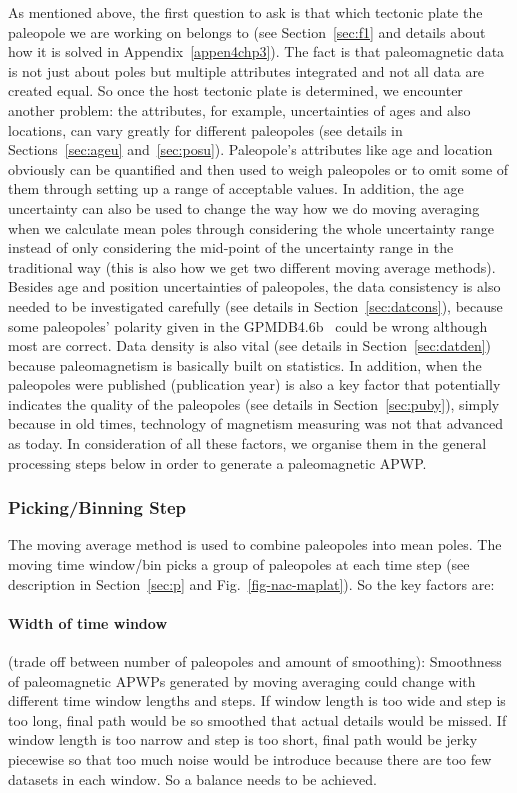 As mentioned above, the first question to ask is that which tectonic plate the
paleopole we are working on belongs to (see Section~\ref{sec:f1} and details about how
it is solved in Appendix~\ref{appen4chp3}). The fact is that paleomagnetic data is not just
about poles but multiple attributes integrated and not all data are created
equal. So once the host tectonic plate is determined, we encounter another
problem: the attributes, for example, uncertainties of ages and also locations,
can vary greatly for different paleopoles (see details in
Sections~\ref{sec:ageu} and~\ref{sec:posu}). Paleopole's attributes like age and location obviously can be
quantified and then used to weigh paleopoles or to omit some of them through
setting up a range of acceptable values. In addition, the age uncertainty can
also be used to change the way how we do moving averaging when we calculate mean
poles through considering the whole uncertainty range instead of only
considering the mid-point of the uncertainty range in the traditional way (this
is also how we get two different moving average methods). Besides age and
position uncertainties of paleopoles, the data consistency is also needed to be
investigated carefully (see details in Section~\ref{sec:datcons}), because some
paleopoles' polarity given in the GPMDB4.6b~\cite[updated in 2016 by the Ivar
Giaever Geomagnetic Laboratory team, in collaboration with Pisarevsky]{M96,P05}
could be wrong although most are correct. Data density is also vital (see
details in Section~\ref{sec:datden}) because paleomagnetism is basically built
on statistics. In addition, when the paleopoles were published (publication
year) is also a key factor that potentially indicates the quality of the
paleopoles (see details in Section~\ref{sec:puby}), simply because in old times,
technology of magnetism measuring was not that advanced as today. In
consideration of all these factors, we organise them in the general processing
steps below in order to generate a paleomagnetic APWP\@.

\subsubsection{Picking/Binning Step}

The moving average method is used to combine paleopoles into mean poles. The
moving time window/bin picks a group of paleopoles at each time step (see
description in Section~\ref{sec:p} and Fig.~\ref{fig-nac-maplat}). So the key
factors are:

\paragraph{Width of time window}
(trade off between number of paleopoles and amount of smoothing): Smoothness of
paleomagnetic APWPs generated by moving averaging could change with different
time window lengths and steps. If window length is too wide and step is too
long, final path would be so smoothed that actual details would be missed. If
window length is too narrow and step is too short, final path would be jerky
piecewise so that too much noise would be introduce because there are too few
datasets in each window. So a balance needs to be achieved.

